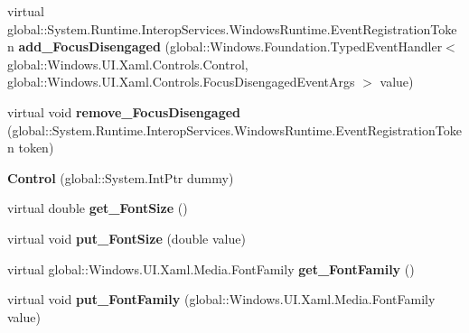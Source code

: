 \begin{DoxyCompactItemize}
\item 
\mbox{\label{class_windows_1_1_u_i_1_1_xaml_1_1_controls_1_1_control_a37520b52e70f32ebd8cf57ee3b584dcf}} 
virtual global\+::\+System.\+Runtime.\+Interop\+Services.\+Windows\+Runtime.\+Event\+Registration\+Token {\bfseries add\+\_\+\+Focus\+Disengaged} (global\+::\+Windows.\+Foundation.\+Typed\+Event\+Handler$<$ global\+::\+Windows.\+U\+I.\+Xaml.\+Controls.\+Control, global\+::\+Windows.\+U\+I.\+Xaml.\+Controls.\+Focus\+Disengaged\+Event\+Args $>$ value)
\item 
\mbox{\label{class_windows_1_1_u_i_1_1_xaml_1_1_controls_1_1_control_a8242a4de1e17e601516c00e9e14f7415}} 
virtual void {\bfseries remove\+\_\+\+Focus\+Disengaged} (global\+::\+System.\+Runtime.\+Interop\+Services.\+Windows\+Runtime.\+Event\+Registration\+Token token)
\item 
\mbox{\label{class_windows_1_1_u_i_1_1_xaml_1_1_controls_1_1_control_ac6f409bd00a64ebd932806d0bd90b1cf}} 
{\bfseries Control} (global\+::\+System.\+Int\+Ptr dummy)
\item 
\mbox{\label{class_windows_1_1_u_i_1_1_xaml_1_1_controls_1_1_control_a56b25a73046ea0559a9e7cc2806702e8}} 
virtual double {\bfseries get\+\_\+\+Font\+Size} ()
\item 
\mbox{\label{class_windows_1_1_u_i_1_1_xaml_1_1_controls_1_1_control_af511651d84c62e096804d65532964059}} 
virtual void {\bfseries put\+\_\+\+Font\+Size} (double value)
\item 
\mbox{\label{class_windows_1_1_u_i_1_1_xaml_1_1_controls_1_1_control_ad993e612b853d9afcb875a5e4234fcc1}} 
virtual global\+::\+Windows.\+U\+I.\+Xaml.\+Media.\+Font\+Family {\bfseries get\+\_\+\+Font\+Family} ()
\item 
\mbox{\label{class_windows_1_1_u_i_1_1_xaml_1_1_controls_1_1_control_af2d5ee1323dfd2ae954b480a76f90bba}} 
virtual void {\bfseries put\+\_\+\+Font\+Family} (global\+::\+Windows.\+U\+I.\+Xaml.\+Media.\+Font\+Family value)

\end{DoxyCompactItemize}
